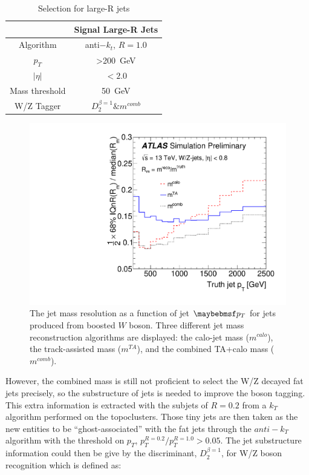 \begin{table}[h]
	\caption{Selection for large-R jets}\label{Tab:Jdefinit}
	\vspace{2.0em}
	\centering
	\begin{tabular}{|c||c|}
		\hline
		& Signal Large-R Jets\\
		\hline
		Algorithm & anti$-k_t$, $R=1.0$\\
		$p_{T}$   & >200~GeV\\
		$| \eta |$      & $< 2.0 $\\
		Mass threshold  & 50~GeV\\
		W/Z Tagger &  $D^{\beta =1}_2 \& m^{comb}$ \\
		\hline
	\end{tabular}
\end{table}
\begin{figure}[ht]
	\begin{center}
		\includegraphics[width=0.6\hsize]{Chapter3/mass_resolution}
		\caption{The jet mass resolution as a function of jet $\p_{T}$ for jets produced from boosted $W$ boson\cite{ATLAS-CONF-2016-035}. Three different jet mass reconstruction algorithms are displayed: the calo-jet mass ($m^{{calo}}$), the track-assisted mass ($m^{{TA}}$), and the combined TA+calo mass ($m^{{comb}}$).}
		\label{Fig:combinedmassperformance}
	\end{center}
\end{figure}
\noindent
However, the combined mass is still not proficient to select the W/Z decayed fat jets precisely, so the substructure of jets is needed to improve the boson tagging. This extra information is extracted with the subjets of $R=0.2$ from a $k_{T}$ algorithm performed on the topoclusters. Those tiny jets are then taken as the new entities to be ``ghost-associated'' with the fat jets through the $anti-k_{T}$ algorithm with the threshold on $p_{T}$, $p_{T}^{R=0.2}/p_{T}^{R=1.0}>0.05$. The jet substructure information could then be give by the discriminant, $D^{\beta =1}_{2}$, for W/Z boson recognition\cite{Larkoski:2014gra} which is defined as:
